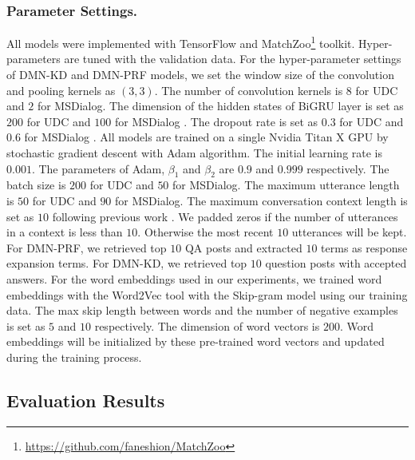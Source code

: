 \subsubsection{\textbf{ Parameter Settings}.} 
All models were implemented with TensorFlow and MatchZoo\footnote{\url{https://github.com/faneshion/MatchZoo}} toolkit. Hyper-parameters are tuned with the validation data. For the hyper-parameter settings of DMN-KD and DMN-PRF models, we set the window size of the convolution and pooling kernels as $(3,3)$. The number of convolution kernels is $8$ for UDC and $2$ for MSDialog. The dimension of the hidden states of BiGRU layer is set as $200$ for UDC  and $100$ for MSDialog . The dropout rate is set as $0.3$ for UDC  and $0.6$ for MSDialog . All models are trained on a single Nvidia Titan X GPU by stochastic gradient descent with Adam\cite{DBLP:journals/corr/KingmaB14} algorithm. The initial learning rate is $0.001$. The parameters of Adam, $\beta_1$ and $\beta_2$ are $0.9$ and $0.999$ respectively. The batch size is $200$ for UDC and $50$ for MSDialog. The maximum utterance length is $50$ for UDC and $90$ for MSDialog. The maximum conversation context length is set as $10$ following previous work \cite{DBLP:conf/acl/WuWXZL17}. We padded zeros if the number of utterances in a context is less than $10$. Otherwise the most recent $10$ utterances will be kept. For DMN-PRF, we retrieved top $10$ QA posts and extracted $10$ terms as response expansion terms. For DMN-KD, we retrieved top $10$ question posts with accepted answers. For the word embeddings used in our experiments, we trained word embeddings with the Word2Vec tool \cite{DBLP:conf/nips/MikolovSCCD13} with the Skip-gram model using our training data. The max skip length between words and the number of negative examples is set as $5$ and $10$ respectively. The dimension of word vectors is $200$. Word embeddings will be initialized by these pre-trained word vectors and updated during the training process.


\subsection{Evaluation Results}
